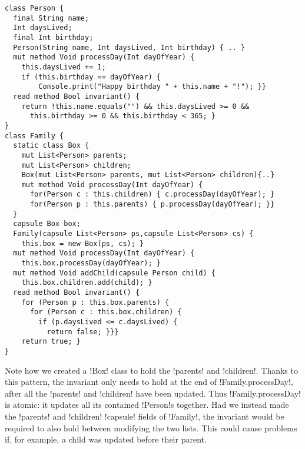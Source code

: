 
\begin{lstlisting}
class Person { 
  final String name;
  Int daysLived;
  final Int birthday;
  Person(String name, Int daysLived, Int birthday) { .. }
  mut method Void processDay(Int dayOfYear) {
  	this.daysLived += 1;
    if (this.birthday == dayOfYear) {
    	Console.print("Happy birthday " + this.name + "!"); }}
  read method Bool invariant() {
    return !this.name.equals("") && this.daysLived >= 0 &&
      this.birthday >= 0 && this.birthday < 365; }
}
class Family { 
  static class Box { 
    mut List<Person> parents;
    mut List<Person> children;
    Box(mut List<Person> parents, mut List<Person> children){..}
    mut method Void processDay(Int dayOfYear) {
      for(Person c : this.children) { c.processDay(dayOfYear); }
      for(Person p : this.parents) { p.processDay(dayOfYear); }}
  }
  capsule Box box;
  Family(capsule List<Person> ps,capsule List<Person> cs) {
    this.box = new Box(ps, cs); }
  mut method Void processDay(Int dayOfYear) { 
    this.box.processDay(dayOfYear); }
  mut method Void addChild(capsule Person child) { 
    this.box.children.add(child); }
  read method Bool invariant() {
    for (Person p : this.box.parents) {
      for (Person c : this.box.children) {
        if (p.daysLived <= c.daysLived) { 
          return false; }}}
    return true; }
}
\end{lstlisting}
Note how we created a \Q!Box! class to hold the \Q!parents! and \Q!children!.
Thanks to this pattern, the invariant only needs to hold at the end of \Q!Family.processDay!, after all the \Q!parents! and \Q!children! have been updated. Thus \Q!Family.processDay! is atomic: it updates all its contained \Q!Person!s together.
Had we instead made the \Q!parents! and \Q!children! \Q!capsule! fields of \Q!Family!, the invariant would be required to also hold between modifying the two lists. This could cause problems if, for example, a child was updated before their parent.

